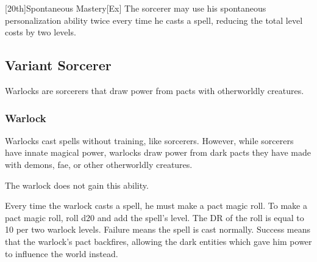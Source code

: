 [20th]{Spontaneous Mastery}[Ex]
The sorcerer may use his spontaneous personalization ability twice every time he casts a spell, reducing the total level costs by two levels.

\subsection{Variant Sorcerer}

Warlocks are sorcerers that draw power from pacts with otherworldly creatures.

\subsubsection{Warlock}

Warlocks cast spells without training, like sorcerers.
However, while sorcerers have innate magical power, warlocks draw power from dark pacts they have made with demons, fae, or other otherworldly creatures.

 The warlock does not gain this ability.

 Every time the warlock casts a spell, he must make a pact magic roll.
To make a pact magic roll, roll d20 and add the spell's level.
The DR of the roll is equal to 10  per two warlock levels.
Failure means the spell is cast normally.
Success means that the warlock's pact backfires, allowing the dark entities which gave him power to influence the world instead.

